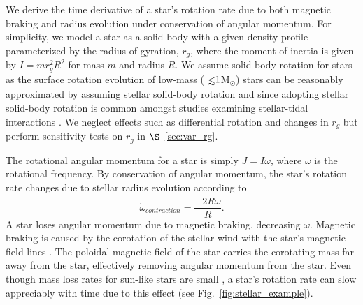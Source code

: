 We derive the time derivative of a star's rotation rate due to both magnetic braking and radius evolution under conservation of angular momentum.  For simplicity, we model a star as a solid body with a given density profile parameterized by the radius of gyration, $r_g$, where the moment of inertia is given by $I = m r_g^2 R^2$ for mass $m$ and radius $R$.  We assume solid body rotation for stars as the surface rotation evolution of low-mass (${\lsim}1$M$_{\odot}$) stars can be reasonably approximated by assuming stellar solid-body rotation \citep{Bouvier1997} and since adopting stellar solid-body rotation is common amongst studies examining stellar-tidal interactions \citep[e.g.][]{DobbsDixon2004,Heller2011,Barnes2013,Repetto2014,Bolmont2016,Bolmont2017}.  We neglect effects such as differential rotation and changes in $r_g$ but perform sensitivity tests on $r_g$ in $\S$~\ref{sec:var_rg}.

The rotational angular momentum for a star is simply $J = I \omega$, where $\omega$ is the rotational frequency.  By conservation of angular momentum, the star's rotation rate changes due to stellar radius evolution according to
\begin{equation} \label{eqn:rot_ang_mom_dt}
\dot{\omega}_{contraction} = \frac{-2 \dot{R} \omega}{R}.
\end{equation}
A star loses angular momentum due to magnetic braking, decreasing $\omega$.  Magnetic braking is caused by the corotation of the stellar wind with the star's magnetic field lines \citep[see][]{Parker1958,Mestel1968}.  The poloidal magnetic field of the star carries the corotating mass far away from the star, effectively removing angular momentum from the star.  Even though mass loss rates for sun-like stars are small \citep[e.g., $\dot{M}{\sim}10^{-14}$ M$_{\odot}$/yr;][]{Tarduno2014}, a star's rotation rate can slow appreciably with time due to this effect (see Fig.~\ref{fig:stellar_example}).  

